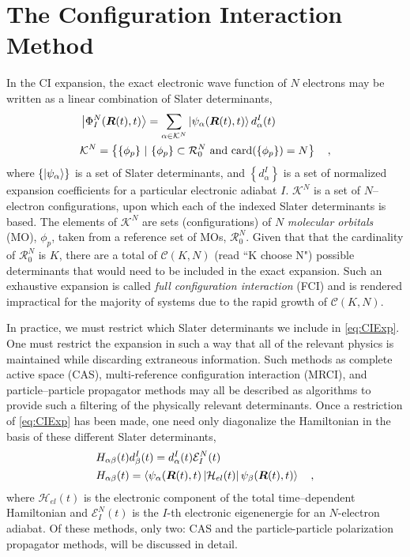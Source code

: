 \section{The Configuration Interaction Method}
\label{sec:ci}

In the CI expansion, the exact electronic wave function of $N$ electrons may be
written as a linear combination of Slater determinants\cite{Szabo},
\begin{align}
&\left\vert \Phi^N_I (\boldsymbol{R}(t),t) \right\rangle = \sum_{\alpha \in \mathcal{K}^N}  
  \left\vert \psi_\alpha (\boldsymbol{R}(t),t) \right\rangle d^I_\alpha(t)
\label{eq:CIExp} \\
& \mathcal{K}^N = \left\lbrace \{ \phi_p \} \text{ }\vert\text{ } \{ \phi_p \} \subset
\mathcal{R}_0^N \text{ and } \mathrm{card}(\{ \phi_p \}) = N \right\rbrace
\quad ,
\end{align}
where $\left\lbrace\left\vert \psi_\alpha \right\rangle\right\rbrace$ is a set of Slater
determinants, and $\left\lbrace d^I_\alpha \right\rbrace$ is a set of normalized
expansion coefficients for a particular electronic adiabat $I$. $\mathcal{K}^N$ is
a set of $N$--electron configurations, upon which each of the indexed Slater
determinants is based. The elements of $\mathcal{K}^N$ are sets (configurations)
of $N$ \emph{molecular orbitals} (MO), $\phi_p$, taken from a reference set of MOs,
$\mathcal{R}^N_0$.  
Given that that the cardinality of $\mathcal{R}^N_0$ is $K$, there are a total
of $\mathcal{C}(K,N)$ (read ``K choose N") possible determinants that would need
to be included in the exact expansion. Such an exhaustive expansion is called
\emph{full configuration interaction} (FCI) and is rendered impractical for the
majority of systems due to the rapid growth of $\mathcal{C}(K,N)$.  

In practice, we  must restrict which Slater determinants we include in
\cref{eq:CIExp}.  One must restrict the expansion in such a way that all of the
relevant physics is maintained while discarding extraneous information. Such
methods as complete active space (CAS),
\cite{Schlegel92_CPL524,Handy84_CPL315,Handy82_JCP1,Joergensen78_JCP3833}
multi-reference configuration interaction (MRCI), 
\cite{Knowles88_JCP1}
and particle--particle propagator methods
\cite{Yang13_224105,Yang13_18A522,
Yang13_174110,Yang13_104112,Yang13_030501,Yang09_066403,Bulik13_104113}
 may all be described as algorithms to provide such a filtering of the
 physically relevant determinants.  Once a restriction of \cref{eq:CIExp} has
 been made, one need only diagonalize the Hamiltonian in the basis of these
 different Slater determinants,
\begin{align}
&H_{\alpha\beta}(t) d_\beta^I(t) = d_\alpha^I(t) \mathcal{E}^N_I(t)
\label{eq:CIEig}\\
&H_{\alpha\beta}(t) =
\left\langle \psi_\alpha(\boldsymbol{R}(t),t) \left\vert \mathcal{H}_{el}(t) \right\vert \psi_\beta(\boldsymbol{R}(t),t) \right\rangle
\quad,
\end{align}
where $\mathcal{H}_{el}(t)$ is the electronic component of the total
time--dependent Hamiltonian and $\mathcal{E}^N_I(t)$ is the $I$-th electronic
eigenenergie for an $N$-electron adiabat. 
Of these methods, only two: CAS and the particle-particle polarization
propagator methods, will be discussed in detail. 

